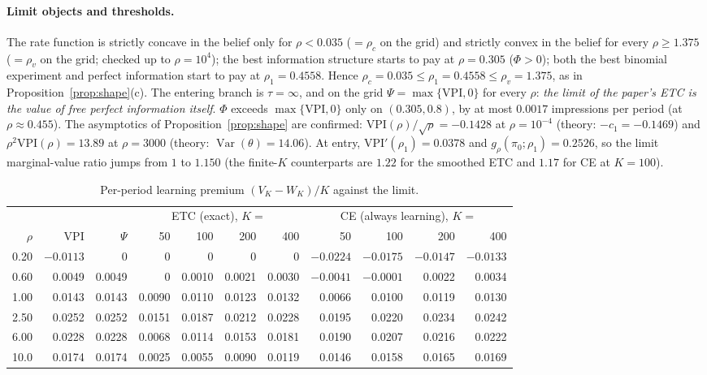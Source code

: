 \documentclass[11pt]{article}
\theoremstyle{definition}
\theoremstyle{remark}
\newcommand{\VPI}{\mathrm{VPI}}
\DeclareMathOperator{\Var}{Var}
\begin{document}
\paragraph{Limit objects and thresholds.} The rate function is strictly concave in the belief only for
$\rho<0.035$ ($=\rho_c$ on the grid) and strictly convex in the belief for every $\rho\ge1.375$ ($=\rho_v$ on the grid;
checked up to $\rho=10^4$); the best information structure starts to pay at $\rho=0.305$ ($\Phi>0$);
both the best binomial experiment and perfect information start to pay at $\rho_1=0.4558$. Hence
$\rho_c=0.035\le\rho_1=0.4558\le\rho_v=1.375$, as in Proposition~\ref{prop:shape}(c). The entering branch is
$\tau=\infty$, and on the grid $\Psi=\max\{\VPI,0\}$ for every $\rho$: \emph{the limit of the paper's ETC is the value of
free perfect information itself}. $\Phi$ exceeds $\max\{\VPI,0\}$ only on $(0.305,0.8)$, by at most $0.0017$ impressions
per period (at $\rho\approx0.455$). The asymptotics of Proposition~\ref{prop:shape} are confirmed: $\VPI(\rho)/\sqrt\rho=-0.1428$ at
$\rho=10^{-4}$ (theory: $-c_1=-0.1469$) and $\rho^2\VPI(\rho)=13.89$ at $\rho=3000$ (theory: $\Var(\theta)=14.06$). At
entry, $\VPI'(\rho_1)=0.0378$ and $g_\rho(\pi_0;\rho_1)=0.2526$, so the limit marginal-value ratio jumps from $1$ to
$1.150$ (the finite-$K$ counterparts are $1.22$ for the smoothed ETC and $1.17$ for CE at $K=100$).

\begin{table}[h]
\centering\small
\caption{Per-period learning premium $(V_K-W_K)/K$ against the limit.}
\label{tab:conv}
\begin{tabular}{@{}r r r rrrr rrrr@{}}
\toprule
& & & \multicolumn{4}{c}{ETC (exact), $K=$} & \multicolumn{4}{c}{CE (always learning), $K=$}\\
\cmidrule(lr){4-7}\cmidrule(lr){8-11}
$\rho$ & $\VPI$ & $\Psi$ & 50 & 100 & 200 & 400 & 50 & 100 & 200 & 400\\
\midrule
0.20 & $-0.0113$ & 0 & 0 & 0 & 0 & 0 & $-0.0224$ & $-0.0175$ & $-0.0147$ & $-0.0133$\\
0.60 & 0.0049 & 0.0049 & 0 & 0.0010 & 0.0021 & 0.0030 & $-0.0041$ & $-0.0001$ & 0.0022 & 0.0034\\
1.00 & 0.0143 & 0.0143 & 0.0090 & 0.0110 & 0.0123 & 0.0132 & 0.0066 & 0.0100 & 0.0119 & 0.0130\\
2.50 & 0.0252 & 0.0252 & 0.0151 & 0.0187 & 0.0212 & 0.0228 & 0.0195 & 0.0220 & 0.0234 & 0.0242\\
6.00 & 0.0228 & 0.0228 & 0.0068 & 0.0114 & 0.0153 & 0.0181 & 0.0190 & 0.0207 & 0.0216 & 0.0222\\
10.0 & 0.0174 & 0.0174 & 0.0025 & 0.0055 & 0.0090 & 0.0119 & 0.0146 & 0.0158 & 0.0165 & 0.0169\\
\bottomrule
\end{tabular}
\end{table}
\end{document}
